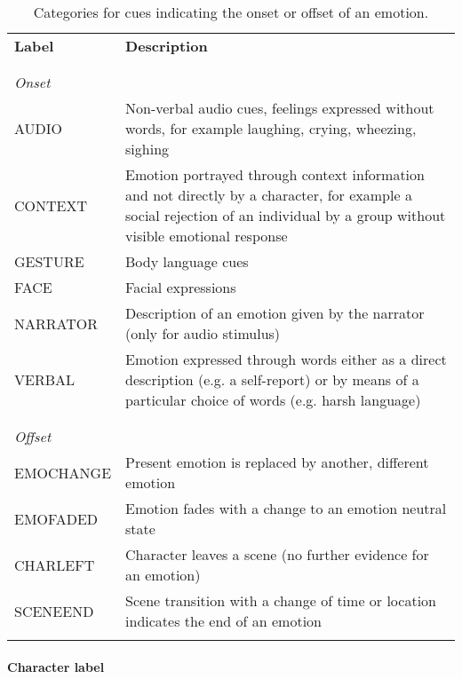 \begin{table*}
  \centering
  \begin{tabular}{lp{10cm}}
    \textbf{Label} & \textbf{Description} \\
    \\\hline\\
    \textit{Onset}\\
    AUDIO & Non-verbal audio cues, feelings expressed without words, for example laughing, crying, wheezing, sighing\\
    CONTEXT & Emotion portrayed through context information and not directly by a character, for example a social rejection of an individual by a group without visible emotional response\\
    GESTURE & Body language cues \\
    FACE & Facial expressions \\
    NARRATOR & Description of an emotion given by the narrator (only for audio stimulus)\\
    VERBAL & Emotion expressed through words either as a direct description (e.g. a self-report) or by means of a particular choice of words (e.g. harsh language)\\
    \\\hline\\
    \textit{Offset}\\
    EMOCHANGE & Present emotion is replaced by another, different emotion \\
    EMOFADED & Emotion fades with a change to an emotion neutral state \\
    CHARLEFT & Character leaves a scene (no further evidence for an emotion)\\
    SCENEEND & Scene transition with a change of time or location indicates the end of an emotion\\
    \\\hline

  \end{tabular}
  \caption{Categories for cues indicating the onset or offset of an emotion.}
  \label{tab:onoffset_indicators}
\end{table*}



\paragraph{Character label}

